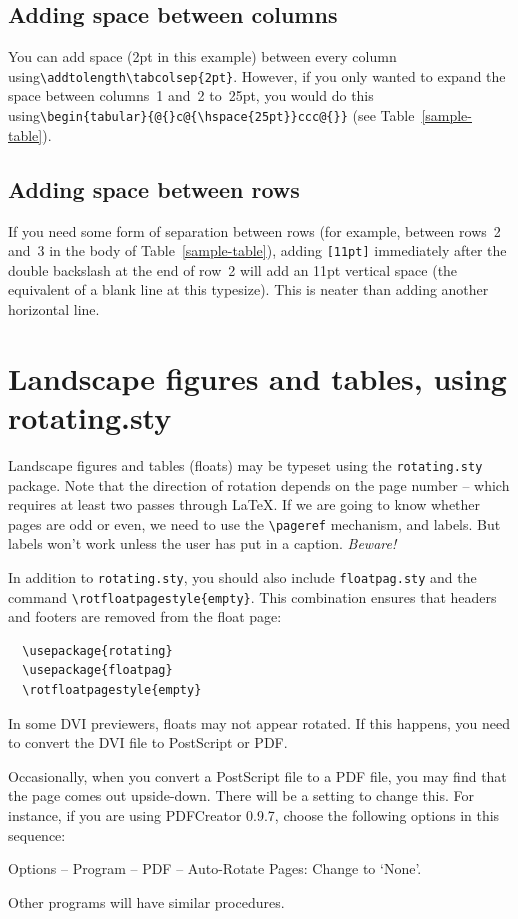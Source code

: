 \subsection{Adding space between columns}
\label{addhoriz}
You can add space (2pt in this example) between every column using\linebreak \verb"\addtolength\tabcolsep{2pt}". However, if you only wanted to expand the space between columns~1 and~2 to~25pt, you would do this using\linebreak  \verb"\begin{tabular}{@{}c@{\hspace{25pt}}ccc@{}}" (see Table~\ref{sample-table}).

\subsection{Adding space between rows}
If you need some form of separation between rows (for example, between rows~2 and~3 in the body of Table~\ref{sample-table}), adding \verb"[11pt]" immediately after the double backslash at the end of row~2 will add an 11pt vertical space (the equivalent of a blank line at this typesize). This is neater than adding another horizontal line.


\section{Landscape figures and tables, using rotating.sty}

Landscape figures and tables (floats) may be typeset using the \verb"rotating.sty" package. Note that the direction of rotation depends on the page number -- which requires at least two passes through \LaTeX. If we are going to know whether pages are odd or even, we need to use the \verb"\pageref" mechanism, and labels. But labels won't work unless the user has put in a caption. \textit{Beware!}

In addition to \verb"rotating.sty", you should also include \verb"floatpag.sty" and the command \verb"\rotfloatpagestyle{empty}". This combination ensures that headers and footers are removed from the float page:
\begin{verbatim}
  \usepackage{rotating}
  \usepackage{floatpag}
  \rotfloatpagestyle{empty}
\end{verbatim}
In some DVI previewers, floats may not appear rotated. If this happens, you need to convert the DVI file to PostScript or PDF.

Occasionally, when you convert a PostScript file to a PDF file, you may find that the page comes out upside-down. There will be a setting to change this. For instance, if you are using PDFCreator 0.9.7, choose the following options in this sequence:
\begin{description}
  \item Options -- Program -- PDF -- Auto-Rotate Pages: Change to `None'.
\end{description}
Other programs will have similar\vadjust{\pagebreak} procedures.


